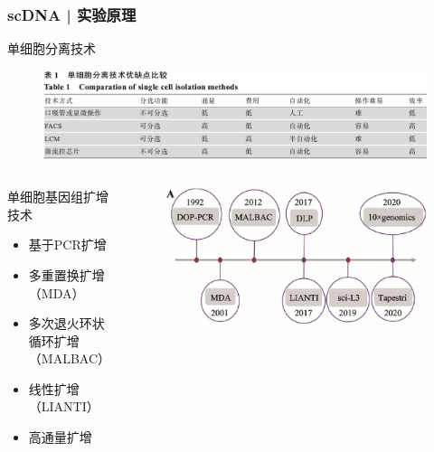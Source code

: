 \documentclass[11pt]{ctexbeamer}
\begin{document}
\begin{frame}
  \frametitle{scDNA | 实验原理}
  \begin{block}{单细胞分离技术}
  \begin{figure}
    \centering
    \includegraphics[width=\textwidth]{scDNA_isolation.png}
  \end{figure}
  \end{block}
  \vspace{-0.5em}
  \pause
  \begin{columns}
    \begin{block}{单细胞基因组扩增技术}
      \begin{itemize}
        \item 基于PCR扩增
        \item 多重置换扩增（MDA）
        \item 多次退火环状循环扩增（MALBAC）
        \item 线性扩增（LIANTI）
        \item 高通量扩增
      \end{itemize}
    \end{block}
  \begin{figure}
    \centering
    \includegraphics[width=\textwidth]{scDNA_amp.png}
  \end{figure}
  \end{columns}
\end{frame}
\end{document}
